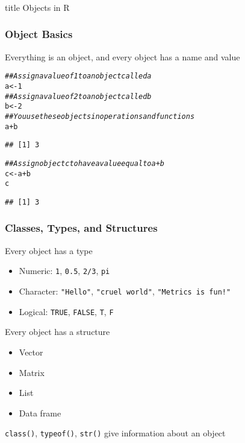 \documentclass{beamer}\usepackage[]{graphicx}\usepackage[]{color}
\makeatletter
\newcommand{\hlnum}[1]{\textcolor[rgb]{0.686,0.059,0.569}{#1}}%
\newcommand{\hlcom}[1]{\textcolor[rgb]{0.678,0.584,0.686}{\textit{#1}}}%
\newcommand{\hlopt}[1]{\textcolor[rgb]{0,0,0}{#1}}%
\newcommand{\hlstd}[1]{\textcolor[rgb]{0.345,0.345,0.345}{#1}}%
\newcommand{\hlkwb}[1]{\textcolor[rgb]{0.69,0.353,0.396}{#1}}%
\newenvironment{kframe}{%
 \def\at@end@of@kframe{}%
 \ifinner\ifhmode%
  \def\at@end@of@kframe{\end{minipage}}%
  \begin{minipage}{\columnwidth}%
 \fi\fi%
 \def\FrameCommand##1{\hskip\@totalleftmargin \hskip-\fboxsep
 \colorbox{shadecolor}{##1}\hskip-\fboxsep
     \hskip-\linewidth \hskip-\@totalleftmargin \hskip\columnwidth}%
 \MakeFramed {\advance\hsize-\width
   \@totalleftmargin\z@ \linewidth\hsize
   \@setminipage}}%
 {\par\unskip\endMakeFramed%
 \at@end@of@kframe}
\newenvironment{knitrout}{}{} %
\makeatother
\begin{document}
\begin{frame}\frametitle{}
    \vfill
    \centering
    \begin{beamercolorbox}[center]{title}
        \Large Objects in R
    \end{beamercolorbox}
    \vfill
\end{frame}

\begin{frame}[fragile]\frametitle{Object Basics}
    Everything is an object, and every object has a name and value
\begin{knitrout}\footnotesize
{}\color{fgcolor}\begin{kframe}
\begin{alltt}
\hlcom{## Assign a value of 1 to an object called a}
\hlstd{a} \hlkwb{<-} \hlnum{1}
\hlcom{## Assign a value of 2 to an object called b}
\hlstd{b} \hlkwb{<-} \hlnum{2}
\hlcom{## You use these objects in operations and functions}
\hlstd{a} \hlopt{+} \hlstd{b}
\end{alltt}
\begin{verbatim}
## [1] 3
\end{verbatim}
\begin{alltt}
\hlcom{## Assign object c to have a value equal to a + b}
\hlstd{c} \hlkwb{<-} \hlstd{a} \hlopt{+} \hlstd{b}
\hlstd{c}
\end{alltt}
\begin{verbatim}
## [1] 3
\end{verbatim}
\end{kframe}
\end{knitrout}
\end{frame}

\begin{frame}\frametitle{Classes, Types, and Structures}
    Every object has a type
    \begin{itemize}
        \item Numeric: \texttt{1}, \texttt{0.5}, \texttt{2/3}, \texttt{pi}
        \item Character: \texttt{"Hello"}, \texttt{"cruel world"}, \texttt{"Metrics is fun!"}
        \item Logical: \texttt{TRUE}, \texttt{FALSE}, \texttt{T}, \texttt{F}
    \end{itemize}
    \vspace{2ex}
    Every object has a structure
    \begin{itemize}
        \item Vector
        \item Matrix
        \item List
        \item Data frame
    \end{itemize}
    \vspace{2ex}
    \texttt{class()}, \texttt{typeof()}, \texttt{str()} give information about an object
\end{frame}
\end{document}
